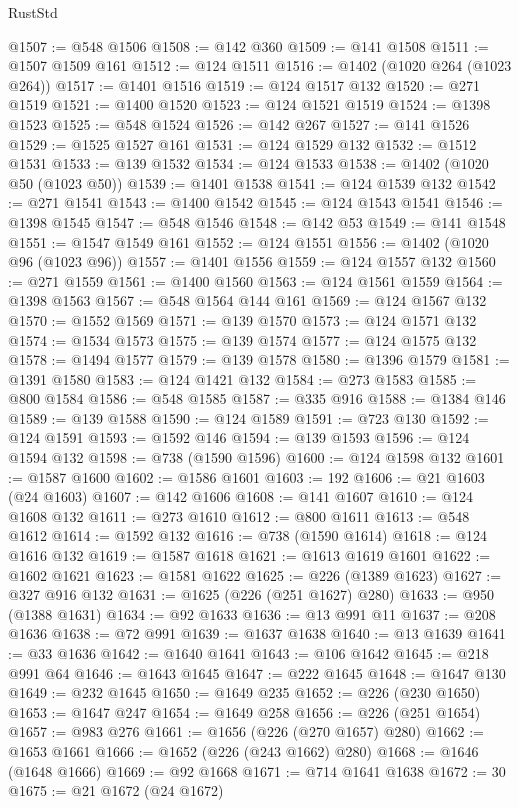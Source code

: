 \begin{lexlean}{RustStd}
\begin{coremodule}
@1507 := @548 @1506
@1508 := @142 @360
@1509 := @141 @1508
@1511 := @1507 @1509 @161
@1512 := @124 @1511
@1516 := @1402 (@1020 @264 (@1023 @264))
@1517 := @1401 @1516
@1519 := @124 @1517 @132
@1520 := @271 @1519
@1521 := @1400 @1520
@1523 := @124 @1521 @1519
@1524 := @1398 @1523
@1525 := @548 @1524
@1526 := @142 @267
@1527 := @141 @1526
@1529 := @1525 @1527 @161
@1531 := @124 @1529 @132
@1532 := @1512 @1531
@1533 := @139 @1532
@1534 := @124 @1533
@1538 := @1402 (@1020 @50 (@1023 @50))
@1539 := @1401 @1538
@1541 := @124 @1539 @132
@1542 := @271 @1541
@1543 := @1400 @1542
@1545 := @124 @1543 @1541
@1546 := @1398 @1545
@1547 := @548 @1546
@1548 := @142 @53
@1549 := @141 @1548
@1551 := @1547 @1549 @161
@1552 := @124 @1551
@1556 := @1402 (@1020 @96 (@1023 @96))
@1557 := @1401 @1556
@1559 := @124 @1557 @132
@1560 := @271 @1559
@1561 := @1400 @1560
@1563 := @124 @1561 @1559
@1564 := @1398 @1563
@1567 := @548 @1564 @144 @161
@1569 := @124 @1567 @132
@1570 := @1552 @1569
@1571 := @139 @1570
@1573 := @124 @1571 @132
@1574 := @1534 @1573
@1575 := @139 @1574
@1577 := @124 @1575 @132
@1578 := @1494 @1577
@1579 := @139 @1578
@1580 := @1396 @1579
@1581 := @1391 @1580
@1583 := @124 @1421 @132
@1584 := @273 @1583
@1585 := @800 @1584
@1586 := @548 @1585
@1587 := @335 @916
@1588 := @1384 @146
@1589 := @139 @1588
@1590 := @124 @1589
@1591 := @723 @130
@1592 := @124 @1591
@1593 := @1592 @146
@1594 := @139 @1593
@1596 := @124 @1594 @132
@1598 := @738 (@1590 @1596)
@1600 := @124 @1598 @132
@1601 := @1587 @1600
@1602 := @1586 @1601
@1603 := 192
@1606 := @21 @1603 (@24 @1603)
@1607 := @142 @1606
@1608 := @141 @1607
@1610 := @124 @1608 @132
@1611 := @273 @1610
@1612 := @800 @1611
@1613 := @548 @1612
@1614 := @1592 @132
@1616 := @738 (@1590 @1614)
@1618 := @124 @1616 @132
@1619 := @1587 @1618
@1621 := @1613 @1619 @1601
@1622 := @1602 @1621
@1623 := @1581 @1622
@1625 := @226 (@1389 @1623)
@1627 := @327 @916 @132
@1631 := @1625 (@226 (@251 @1627) @280)
@1633 := @950 (@1388 @1631)
@1634 := @92 @1633
@1636 := @13 @991 @11
@1637 := @208 @1636
@1638 := @72 @991
@1639 := @1637 @1638
@1640 := @13 @1639
@1641 := @33 @1636
@1642 := @1640 @1641
@1643 := @106 @1642
@1645 := @218 @991 @64
@1646 := @1643 @1645
@1647 := @222 @1645
@1648 := @1647 @130
@1649 := @232 @1645
@1650 := @1649 @235
@1652 := @226 (@230 @1650)
@1653 := @1647 @247
@1654 := @1649 @258
@1656 := @226 (@251 @1654)
@1657 := @983 @276
@1661 := @1656 (@226 (@270 @1657) @280)
@1662 := @1653 @1661
@1666 := @1652 (@226 (@243 @1662) @280)
@1668 := @1646 (@1648 @1666)
@1669 := @92 @1668
@1671 := @714 @1641 @1638
@1672 := 30
@1675 := @21 @1672 (@24 @1672)

\end{coremodule}
\end{lexlean}
